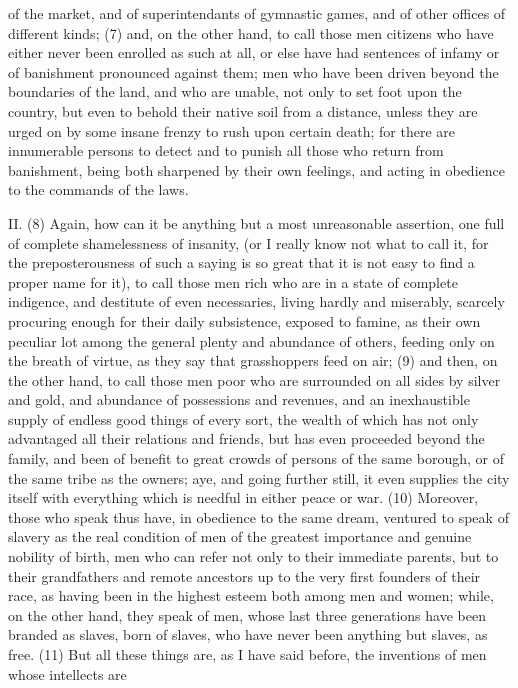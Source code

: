of the market, and of superintendants of gymnastic games, and of other offices of different kinds;
(7) and, on the other hand, to call those men citizens who have either never been enrolled as such
at all, or else have had sentences of infamy or of banishment pronounced against them; men who
have been driven beyond the boundaries of the land, and who are unable, not only to set foot upon
the country, but even to behold their native soil from a distance, unless they are urged on by some
insane frenzy to rush upon certain death; for there are innumerable persons to detect and to
punish all those who return from banishment, being both sharpened by their own feelings, and
acting in obedience to the commands of the laws.

II. (8) Again, how can it be anything but a most unreasonable assertion, one full of complete
shamelessness of insanity, (or I really know not what to call it, for the preposterousness of such a
saying is so great that it is not easy to find a proper name for it), to call those men rich who are in a
state of complete indigence, and destitute of even necessaries, living hardly and miserably,
scarcely procuring enough for their daily subsistence, exposed to famine, as their own peculiar lot
among the general plenty and abundance of others, feeding only on the breath of virtue, as they
say that grasshoppers feed on air; (9) and then, on the other hand, to call those men poor who are
surrounded on all sides by silver and gold, and abundance of possessions and revenues, and an
inexhaustible supply of endless good things of every sort, the wealth of which has not only
advantaged all their relations and friends, but has even proceeded beyond the family, and been of
benefit to great crowds of persons of the same borough, or of the same tribe as the owners; aye,
and going further still, it even supplies the city itself with everything which is needful in either peace
or war. (10) Moreover, those who speak thus have, in obedience to the same dream, ventured to
speak of slavery as the real condition of men of the greatest importance and genuine nobility of
birth, men who can refer not only to their immediate parents, but to their grandfathers and remote
ancestors up to the very first founders of their race, as having been in the highest esteem both
among men and women; while, on the other hand, they speak of men, whose last three generations
have been branded as slaves, born of slaves, who have never been anything but slaves, as free.
(11) But all these things are, as I have said before, the inventions of men whose intellects are
